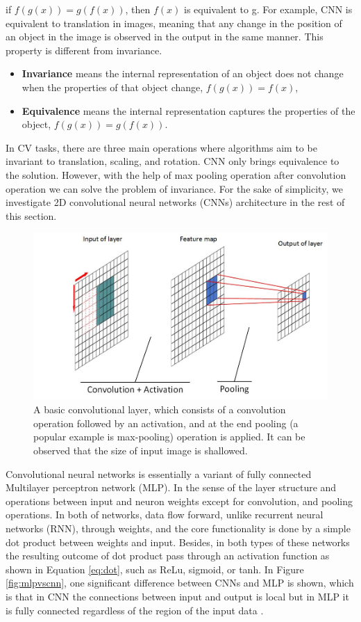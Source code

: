 if  $f(g(x)) = g(f(x))$, then $f(x)$ is equivalent to g.  For example, CNN is equivalent to translation in images, meaning that any change in the position of an object in the image is observed in the output in the same manner.  This property is different from invariance.
\begin{itemize}
\item \textbf{Invariance} means the  internal  representation of an object  does not  change when the properties  of that  object change, $f(g(x)) = f(x)$,
\item \textbf{Equivalence} means  the  internal  representation captures  the  properties  of the object, $f(g(x)) = g(f(x))$. 
\end{itemize}

In CV tasks, there are three main operations where algorithms aim to be invariant to translation, scaling, and rotation.  CNN only brings equivalence to the solution. However, with the help of max pooling operation after convolution operation we can solve the problem of invariance.  For the sake of simplicity, we investigate 2D convolutional neural networks (CNNs) architecture in the rest of this section. \\
\begin{figure}[t!]
	\centering
  \includegraphics[width=0.8\linewidth]{figures/cnn_stages}  
  \caption{A basic convolutional layer, which consists of a convolution operation followed by an activation, and at the end pooling (a popular example is  max-pooling) operation is applied. It can be observed that the size of input image is shallowed.}
  \label{fig:cnnstages}
\end{figure}

Convolutional neural networks is essentially a variant of fully connected Multilayer perceptron network (MLP). In the sense of the layer structure and operations between input and neuron weights except for convolution, and pooling operations.  In both of networks, data flow forward, unlike recurrent neural networks (RNN), through weights, and the core functionality is done by a simple dot product between weights and input. Besides, in both types of these networks the resulting outcome of dot product pass through an activation function as shown in Equation  \ref{eq:dot}, such as ReLu, sigmoid, or tanh.  In Figure \ref{fig:mlpvscnn}, one significant difference between CNNs and MLP is shown, which is that in CNN the connections between input and output is local but in MLP it is fully connected regardless of the region of the input data \cite{lecun_gradient-based_1998}.\\

